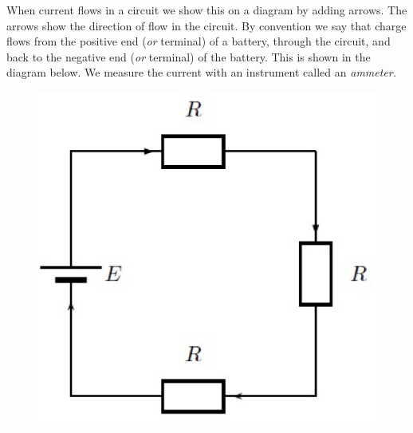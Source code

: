         \label{m38773*id66787}When current flows in a circuit we show this on a diagram by adding arrows. The arrows show the direction of flow in the circuit. By convention we say that charge flows from the positive end (\textsl{or} terminal) of a battery, through the circuit, and back to the negative end (\textsl{or} terminal) of the battery. This is shown in the diagram below. We measure the current with an instrument called an \textsl{ammeter.}\par 
        \label{m38773*id66811}
          
    \setcounter{subfigure}{0}


	\begin{figure}[H] %
    \begin{center}
    \label{m38773*id66814!!!underscore!!!media}\label{m38773*id66814!!!underscore!!!printimage}\includegraphics[width=0.4\columnwidth]{col11305.imgs/m38773_PG10C9_026.png} %
        
      \vspace{2pt}
    \vspace{.1in}
    
    \end{center}

 \end{figure}   

    \addtocounter{footnote}{-0}
    
        \par 

